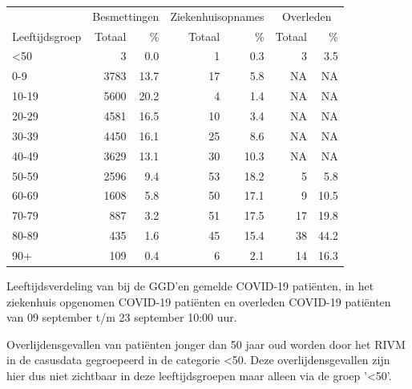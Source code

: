 \documentclass[
  english,
  man,floatsintext]{apa6}
\begin{document}
\begin{table}
\centering\begingroup\fontsize{11}{13}\selectfont

\begin{threeparttable}
\begin{tabular}{lrrrrrr}
\toprule
\multicolumn{1}{c}{ } & \multicolumn{2}{c}{Besmettingen} & \multicolumn{2}{c}{Ziekenhuisopnames} & \multicolumn{2}{c}{Overleden} \\
\cmidrule(l{3pt}r{3pt}){2-3} \cmidrule(l{3pt}r{3pt}){4-5} \cmidrule(l{3pt}r{3pt}){6-7}
Leeftijdsgroep & Totaal & \% & Totaal & \% & Totaal & \%\\
\midrule
<50 & 3 & 0.0 & 1 & 0.3 & 3 & 3.5\\
0-9 & 3783 & 13.7 & 17 & 5.8 & NA & NA\\
10-19 & 5600 & 20.2 & 4 & 1.4 & NA & NA\\
20-29 & 4581 & 16.5 & 10 & 3.4 & NA & NA\\
30-39 & 4450 & 16.1 & 25 & 8.6 & NA & NA\\
40-49 & 3629 & 13.1 & 30 & 10.3 & NA & NA\\
50-59 & 2596 & 9.4 & 53 & 18.2 & 5 & 5.8\\
60-69 & 1608 & 5.8 & 50 & 17.1 & 9 & 10.5\\
70-79 & 887 & 3.2 & 51 & 17.5 & 17 & 19.8\\
80-89 & 435 & 1.6 & 45 & 15.4 & 38 & 44.2\\
90+ & 109 & 0.4 & 6 & 2.1 & 14 & 16.3\\
\bottomrule
\end{tabular}
\begin{tablenotes}
\item[1] Leeftijdsverdeling van bij de GGD’en gemelde COVID-19 patiënten, in het ziekenhuis opgenomen COVID-19 patiënten en overleden COVID-19 patiënten van 09 september t/m 23 september 10:00 uur.
\item[2] Overlijdensgevallen van patiënten jonger dan 50 jaar oud worden door het RIVM in de casusdata gegroepeerd in de categorie <50. Deze overlijdensgevallen zijn hier dus niet zichtbaar in deze leeftijdsgroepen maar alleen via de groep '<50'.
\end{tablenotes}
\end{threeparttable}
\endgroup{}
\end{table}

\newpage
\end{document}
